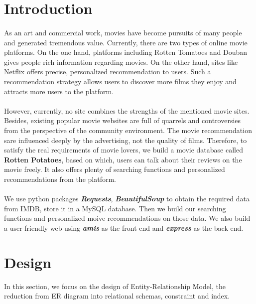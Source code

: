 \begin{CJK*}{UTF8}{gbsn}
\begin{titlepage}
    \vfill
    
\end{titlepage}

\tableofcontents
\pagebreak

\rmfamily
\section{Introduction}
\paragraph{}As an art and commercial work, movies have become pursuits of many people and generated tremendous value. Currently, there are two types of online movie platforms. On the one hand, platforms including Rotten Tomatoes and Douban gives people rich information regarding movies. On the other hand, sites like Netflix offers precise, personalized recommendation to users. Such a recommendation strategy allows users to discover more films they enjoy and attracts more users to the platform.
\paragraph{}However, currently, no site combines the strengths of the mentioned movie sites. Besides, existing popular movie websites are full of quarrels and controversies from the perspective of the community environment. The movie recommendation sare influenced deeply by the advertising, not the quality of films. Therefore, to satisfy the real requirements of movie lovers, we build a movie database called \textbf{Rotten Potatoes}, based on which, users can talk about their reviews on the movie freely. It also offers plenty of searching functions and personalized recommendations from the platform. 
\paragraph{}We use python packages \textbf{\textit{Requests}}, \textbf{\textit{BeautifulSoup}} to obtain the required data from IMDB, store it in a MySQL database. Then we build our searching functions and personalized moive recommendations on those data. We also build a user-friendly web using \textbf{\textit{amis}} as the front end and \textbf{\textit{express}} as the back end.
\section{Design}
In this section, we focus on the design of Entity-Relationship Model, 
the reduction from ER diagram into relational schemas, constraint and index.


\end{CJK*}
